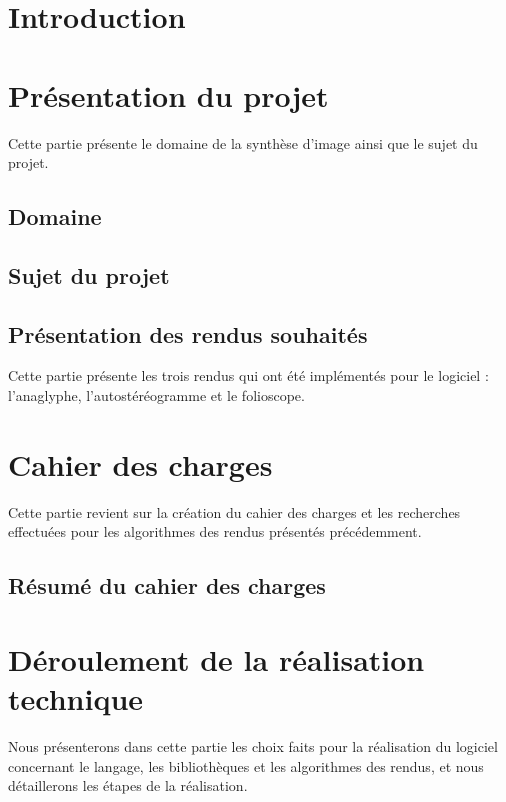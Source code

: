 \documentclass[paper=a4, fontsize=12pt]{article}
\newenvironment{changemargin}[2]{\begin{list}{}{%
      \setlength{\topsep}{0pt}%
      \setlength{\leftmargin}{0pt}%
      \setlength{\rightmargin}{0pt}%
      \setlength{\listparindent}{\parindent}%
      \setlength{\itemindent}{\parindent}%
      \setlength{\parsep}{0pt plus 1pt}%
      \addtolength{\leftmargin}{#1}%
      \addtolength{\rightmargin}{#2}%
    }\item }{\end{list}}
\numberwithin{equation}{section}		%
\numberwithin{figure}{section}			%
\numberwithin{table}{section}				%
\begin{document}
\begin{changemargin}{-1cm}{-1cm}

  \section{Introduction}
  
  \newpage

  \section{Présentation du projet}
  Cette partie présente le domaine de la synthèse d'image ainsi que le sujet du projet. 
  \subsection{Domaine}
  
  \subsection{Sujet du projet}
  
  \subsection{Présentation des rendus souhaités}
  Cette partie présente les trois rendus qui ont été implémentés pour le logiciel : l'anaglyphe, l'autostéréogramme et le folioscope.
  

  \newpage

  \section{Cahier des charges}
  Cette partie revient sur la création du cahier des charges et les recherches effectuées pour les algorithmes des rendus présentés précédemment.
  \subsection{Résumé du cahier des charges}
  
  \newpage


  \section{Déroulement de la réalisation technique}
  Nous présenterons dans cette partie les choix faits pour la réalisation du logiciel concernant le langage, les bibliothèques et les algorithmes des rendus, et nous détaillerons les étapes de la réalisation.


\end{changemargin}
\end{document}
